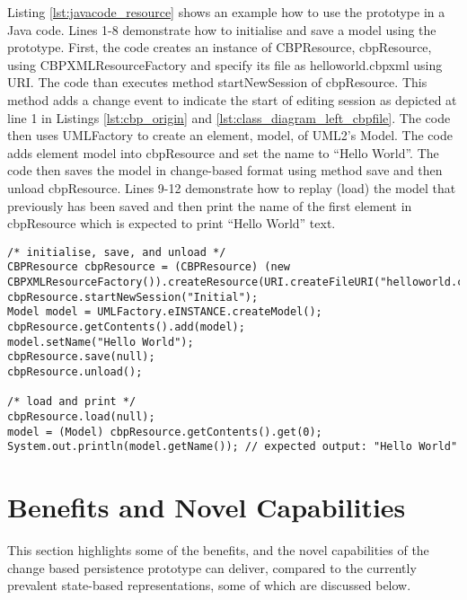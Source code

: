Listing \ref{lst:javacode_resource} shows an example how to use the prototype in a Java code. Lines 1-8 demonstrate how to initialise and save a model using the prototype. First, the code creates an instance of \textsf{CBPResource}, \textsf{cbpResource}, using \textsf{CBPXMLResourceFactory} and specify its file as \textsf{helloworld.cbpxml} using \textsf{URI}. The code than executes method \textsf{startNewSession} of \textsf{cbpResource}. This method adds a change event to indicate the start of editing session as depicted at line 1 in Listings \ref{lst:cbp_origin} and \ref{lst:class_diagram_left_cbpfile}.
The code then uses \textsf{UMLFactory} to create an element, \textsf{model}, of UML2's \textsf{Model}. The code adds element \textsf{model} into \textsf{cbpResource} and set the name to ``Hello World''. The code then saves the model in change-based format using method \textsf{save} and then unload \textsf{cbpResource}. Lines 9-12 demonstrate how to replay (load) the model that previously has been saved and then print the name of the first element in \textsf{cbpResource} which is expected to print ``Hello World'' text.
\begin{lstlisting}[style=java,caption={An example how to use \textsf{CBPResource} in Java code.},label=lst:javacode_resource]
/* initialise, save, and unload */
CBPResource cbpResource = (CBPResource) (new CBPXMLResourceFactory()).createResource(URI.createFileURI("helloworld.cbpxml"));
cbpResource.startNewSession("Initial");
Model model = UMLFactory.eINSTANCE.createModel();
cbpResource.getContents().add(model);
model.setName("Hello World");
cbpResource.save(null);
cbpResource.unload();

/* load and print */
cbpResource.load(null);
model = (Model) cbpResource.getContents().get(0);
System.out.println(model.getName()); // expected output: "Hello World"
\end{lstlisting}

\section{Benefits and Novel Capabilities}
\label{sec:benefits_and_novel_capabilities}
This section highlights some of the benefits, and the novel capabilities of the change based persistence prototype can deliver, compared to the currently prevalent state-based representations, some of which are discussed below.

